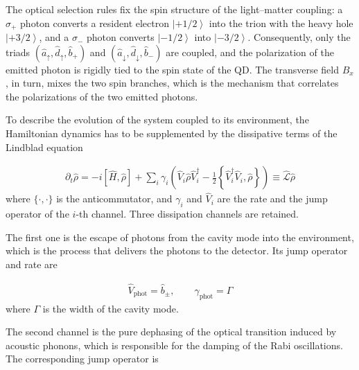 \documentclass[prb,twocolumn,preprintnumbers,superscriptaddress]{revtex4-2}
\DeclareMathOperator{\e}{e}
\begin{document}
The optical selection rules fix the spin structure of the light--matter coupling:
a $\sigma_+$ photon converts a resident electron $\left| +1/2 \right>$ into the trion
with the heavy hole $\left| +3/2 \right>$, and a $\sigma_-$ photon converts
$\left| -1/2 \right>$ into $\left| -3/2 \right>$.
Consequently, only the triads $(\hat{a}_{\uparrow}, \hat{d}_{\uparrow}, \hat{b}_{+})$
and $(\hat{a}_{\downarrow}, \hat{d}_{\downarrow}, \hat{b}_{-})$ are coupled, and the
polarization of the emitted photon is rigidly tied to the spin state of the QD.
The transverse field $B_x$, in turn, mixes the two spin branches, which is the
mechanism that correlates the polarizations of the two emitted photons.


To describe the evolution of the system coupled to its environment, the Hamiltonian
dynamics has to be supplemented by the dissipative terms of the Lindblad equation

\begin{gather}
    \partial_t \hat{\rho} = -i \left[ \hat{H}, \hat{\rho} \right]
    + \sum_i \gamma_{i} \left( \hat{V}_i \hat{\rho} \hat{V}_i^{\dag}
    - \frac{1}{2} \left\{ \hat{V}_i^{\dag} \hat{V}_i , \hat{\rho} \right\} \right)
    \equiv \hat{\mathcal{L}} \hat{\rho}
    \label{eq:lindblad}
\end{gather}
where $\{ \cdot , \cdot \}$ is the anticommutator, and $\gamma_i$ and $\hat{V}_i$ are
the rate and the jump operator of the $i$-th channel.
Three dissipation channels are retained.

The first one is the escape of photons from the cavity mode into the environment,
which is the process that delivers the photons to the detector.
Its jump operator and rate are

\begin{gather}
    \hat{V}_{\text{phot}} = \hat{b}_{\pm} , \qquad \gamma_{\text{phot}} = \Gamma
    \label{eq:jump-phot}
\end{gather}
where $\Gamma$ is the width of the cavity mode.

The second channel is the pure dephasing of the optical transition induced by
acoustic phonons, which is responsible for the damping of the Rabi oscillations.
The corresponding jump operator is
\end{document}
